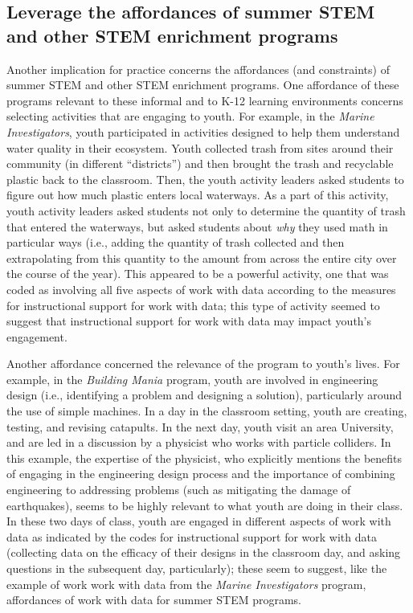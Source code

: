\documentclass[]{book}
\theoremstyle{definition}
\theoremstyle{definition}
\theoremstyle{definition}
\theoremstyle{remark}
\begin{document}
\subsection{Leverage the affordances of summer STEM and other STEM
enrichment
programs}\label{leverage-the-affordances-of-summer-stem-and-other-stem-enrichment-programs}

Another implication for practice concerns the affordances (and
constraints) of summer STEM and other STEM enrichment programs. One
affordance of these programs relevant to these informal and to K-12
learning environments concerns selecting activities that are engaging to
youth. For example, in the \emph{Marine Investigators}, youth
participated in activities designed to help them understand water
quality in their ecosystem. Youth collected trash from sites around
their community (in different ``districts'') and then brought the trash
and recyclable plastic back to the classroom. Then, the youth activity
leaders asked students to figure out how much plastic enters local
waterways. As a part of this activity, youth activity leaders asked
students not only to determine the quantity of trash that entered the
waterways, but asked students about \emph{why} they used math in
particular ways (i.e., adding the quantity of trash collected and then
extrapolating from this quantity to the amount from across the entire
city over the course of the year). This appeared to be a powerful
activity, one that was coded as involving all five aspects of work with
data according to the measures for instructional support for work with
data; this type of activity seemed to suggest that instructional support
for work with data may impact youth's engagement.

Another affordance concerned the relevance of the program to youth's
lives. For example, in the \emph{Building Mania} program, youth are
involved in engineering design (i.e., identifying a problem and
designing a solution), particularly around the use of simple machines.
In a day in the classroom setting, youth are creating, testing, and
revising catapults. In the next day, youth visit an area University, and
are led in a discussion by a physicist who works with particle
colliders. In this example, the expertise of the physicist, who
explicitly mentions the benefits of engaging in the engineering design
process and the importance of combining engineering to addressing
problems (such as mitigating the damage of earthquakes), seems to be
highly relevant to what youth are doing in their class. In these two
days of class, youth are engaged in different aspects of work with data
as indicated by the codes for instructional support for work with data
(collecting data on the efficacy of their designs in the classroom day,
and asking questions in the subsequent day, particularly); these seem to
suggest, like the example of work work with data from the \emph{Marine
Investigators} program, affordances of work with data for summer STEM
programs.
\end{document}
